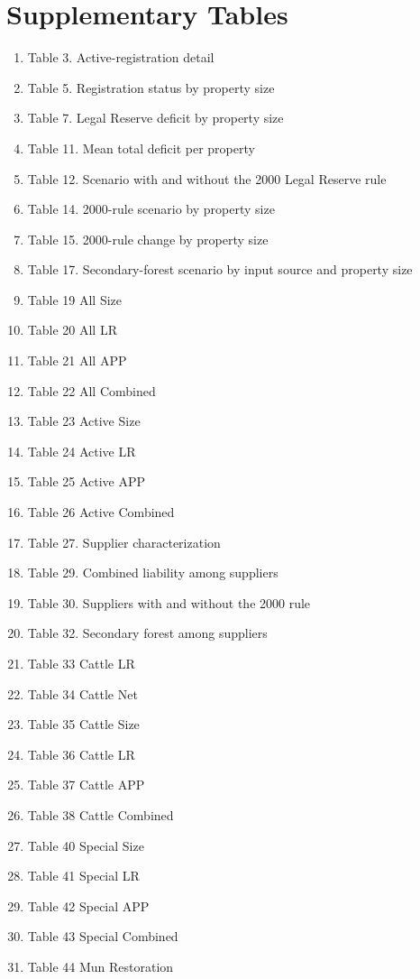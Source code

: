 \documentclass[12pt]{article}
\begin{document}
\section*{Supplementary Tables}
\begin{enumerate}
\item Table 3. Active-registration detail
\item Table 5. Registration status by property size
\item Table 7. Legal Reserve deficit by property size
\item Table 11. Mean total deficit per property
\item Table 12. Scenario with and without the 2000 Legal Reserve rule
\item Table 14. 2000-rule scenario by property size
\item Table 15. 2000-rule change by property size
\item Table 17. Secondary-forest scenario by input source and property size
\item Table 19 All Size
\item Table 20 All LR
\item Table 21 All APP
\item Table 22 All Combined
\item Table 23 Active Size
\item Table 24 Active LR
\item Table 25 Active APP
\item Table 26 Active Combined
\item Table 27. Supplier characterization
\item Table 29. Combined liability among suppliers
\item Table 30. Suppliers with and without the 2000 rule
\item Table 32. Secondary forest among suppliers
\item Table 33 Cattle LR
\item Table 34 Cattle Net
\item Table 35 Cattle Size
\item Table 36 Cattle LR
\item Table 37 Cattle APP
\item Table 38 Cattle Combined
\item Table 40 Special Size
\item Table 41 Special LR
\item Table 42 Special APP
\item Table 43 Special Combined
\item Table 44 Mun Restoration
\end{enumerate}
\clearpage
\end{document}
